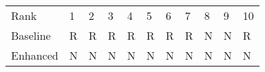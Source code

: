 \begin{tabular}{lllllllllll}
Rank & 1 & 2 & 3 & 4 & 5 & 6 & 7 & 8 & 9 & 10 \\
Baseline & R & R & R & R & R & R & R & N & N & R \\
Enhanced & N & N & N & N & N & N & N & N & N & N \\
\end{tabular}
